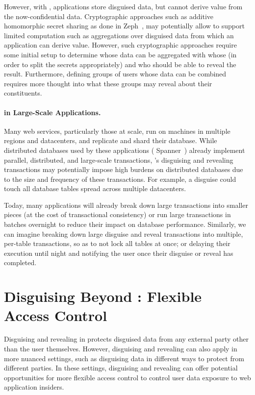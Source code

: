 However, with \sys, applications store disguised data, but cannot derive value
from the now-confidential data.
%
Cryptographic approaches such as additive homomorphic secret sharing
as done in Zeph~\cite{zeph}, may potentially allow \sys to support limited computation such
as aggregations over disguised data from which an application can derive value.
%
However, such cryptographic approaches require some initial setup to determine
whose data can be aggregated with whose (in order to split the secrets
appropriately) and who should be able to reveal the result. Furthermore, defining
groups of users whose data can be combined requires more thought into what these
groups may reveal about their constituents.
%

\paragraph{\sys in Large-Scale Applications.}
Many web services, particularly those at scale, run on machines in multiple 
regions and datacenters, and replicate and shard their database.
%
While distributed databases used by these applications (\eg
Spanner~\cite{spanner}) already implement parallel, distributed, and large-scale
transactions, \sys's disguising and revealing transactions may potentially
impose high burdens on distributed databases due to the size and frequency of
these transactions.
%
For example, a disguise could touch all database tables spread across multiple
datacenters.
%

%
Today, many applications will already break down large transactions into smaller
pieces (at the cost of transactional consistency) or run large transactions in
batches overnight to reduce their impact on database performance.
%
Similarly, we can imagine \sys breaking down large disguise and reveal transactions
into multiple, per-table transactions, so as to not lock all tables at once; or
delaying their execution until night and notifying the user once their
disguise or reveal has completed. 
%

\section{Disguising Beyond \sys: Flexible Access Control}
Disguising and revealing in \sys protects disguised data from any external party
other than the user themselves. However, disguising and revealing can also apply
in more nuanced settings, such as disguising data in different ways to 
protect from different parties. 
%
In these settings, disguising and revealing can offer potential opportunities for
more flexible access control to control user data exposure to web application
insiders.

